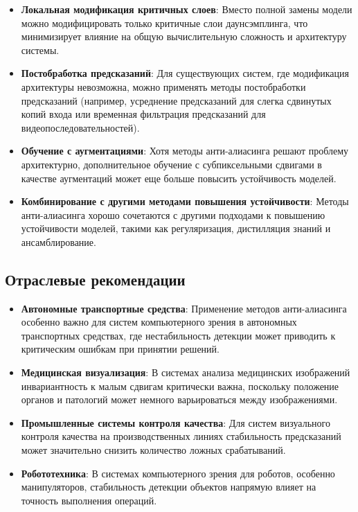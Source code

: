 \begin{itemize}
    \item \textbf{Локальная модификация критичных слоев}: Вместо полной замены модели можно модифицировать только критичные слои даунсэмплинга, что минимизирует влияние на общую вычислительную сложность и архитектуру системы.
    
    \item \textbf{Постобработка предсказаний}: Для существующих систем, где модификация архитектуры невозможна, можно применять методы постобработки предсказаний (например, усреднение предсказаний для слегка сдвинутых копий входа или временная фильтрация предсказаний для видеопоследовательностей).
    
    \item \textbf{Обучение с аугментациями}: Хотя методы анти-алиасинга решают проблему архитектурно, дополнительное обучение с субпиксельными сдвигами в качестве аугментаций может еще больше повысить устойчивость моделей.
    
    \item \textbf{Комбинирование с другими методами повышения устойчивости}: Методы анти-алиасинга хорошо сочетаются с другими подходами к повышению устойчивости моделей, такими как регуляризация, дистилляция знаний и ансамблирование.
\end{itemize}

\subsection{Отраслевые рекомендации}
\label{discussion:recommendations:industry}

\begin{itemize}
    \item \textbf{Автономные транспортные средства}: Применение методов анти-алиасинга особенно важно для систем компьютерного зрения в автономных транспортных средствах, где нестабильность детекции может приводить к критическим ошибкам при принятии решений.
    
    \item \textbf{Медицинская визуализация}: В системах анализа медицинских изображений инвариантность к малым сдвигам критически важна, поскольку положение органов и патологий может немного варьироваться между изображениями.
    
    \item \textbf{Промышленные системы контроля качества}: Для систем визуального контроля качества на производственных линиях стабильность предсказаний может значительно снизить количество ложных срабатываний.
    
    \item \textbf{Робототехника}: В системах компьютерного зрения для роботов, особенно манипуляторов, стабильность детекции объектов напрямую влияет на точность выполнения операций.
\end{itemize}

